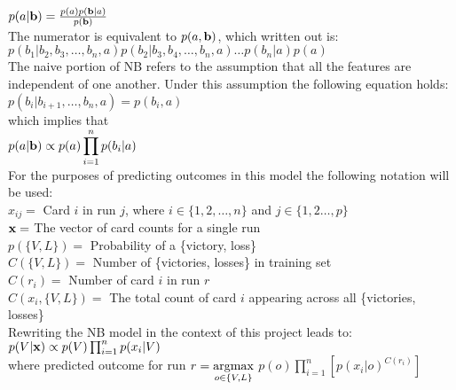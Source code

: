 \documentclass[10pt, a4paper, twocolumn]{article}
\begin{document}
$p(a|\textbf b) = \frac{p(a)p(\textbf b|a)}{p(\textbf b)}$\\

The numerator is equivalent to $p(a,\textbf b)$, which written out is:\\

$ p(b_1|b_2, b_3, \ldots, b_n, a) p(b_2|b_3, b_4, \ldots, b_n, a)\ldots p(b_n|a) p(a)$\\

The naive portion of NB refers to the assumption that all the features are independent of one another.  Under this assumption the following equation holds: \\

$p(b_i|b_{i+1}, …, b_n, a) = p(b_i, a)$\\

which implies that\\

$\displaystyle p(a|\textbf b) \propto p(a)\prod_{i=1}^n p(b_i|a)$\\

For the purposes of predicting outcomes in this model the following notation will be used:\\

$x_{ij} =$ Card $i$ in run $j$, where $i \in \{1, 2, \ldots , n\}$ and $j \in \{1, 2\ldots, p\}$\\

$\textbf x =$ The vector of card counts for a single run\\

$p(\{V, L\}) =$ Probability of a \{victory, loss\}\\

$C(\{V,L\}) =$ Number of \{victories, losses\} in training set\\

$C(r_i) =$ Number of card $i$ in run $r$\\

$C(x_i, \{V,L \}) =$ The total count of card $i$ appearing across all \{victories, losses\}\\

Rewriting the NB model in the context of this project leads to:\\

$p(V|\textbf x) \propto p(V) \prod_{i=1}^n p(x_i |V)$\\

where predicted outcome for run $r = \\ \underset{o\in\{V,L\}}{\mathrm{argmax}}$  $p(o) \displaystyle\prod_{i=1}^n[p(x_i |o)^{ C(r_i)} ] $\\
\end{document}
